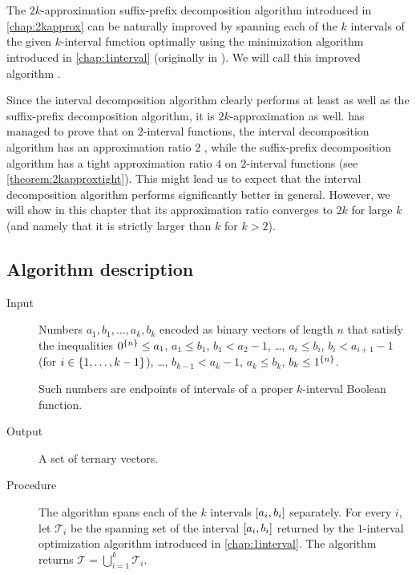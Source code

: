 \chapter{}
\label{chap:betterapprox}

The $2k$-approximation
suffix-prefix decomposition algorithm
introduced in \autoref{chap:2kapprox}
can be naturally improved
by spanning each of the $k$ intervals
of the given $k$-interval function
optimally using the minimization algorithm
introduced in \autoref{chap:1interval}
(originally in \citet{Schieber2005154}).
We will call this improved algorithm
.

Since the interval decomposition algorithm
clearly performs at least as well
as the suffix-prefix decomposition algorithm,
it is $2k$-approximation as well.
\citeauthor{Dubovsky2012} has managed
to prove that on $2$-interval functions,
the interval decomposition algorithm
has an approximation ratio $2$
\citep[p.~39]{Dubovsky2012}, %
while the suffix-prefix decomposition algorithm
has a tight approximation ratio $4$
on $2$-interval functions
(see \autoref{theorem:2kapproxtight}).
This might lead us to expect
that the interval decomposition algorithm
performs significantly better in general.
However,
we will show in this chapter that its approximation ratio
converges to $2k$ for large $k$
(and namely that it is strictly larger than $k$
for $k > 2$).

\section{Algorithm description}

\begin{description}
\item[Input] Numbers $a_1, b_1, \ldots, a_k, b_k$
encoded as binary vectors of length $n$
that satisfy the inequalities
$0^{\{n\}} \leq a_1$,
$a_1 \leq b_1$,
$b_1 < a_2 - 1$,
\ldots,
$a_i \leq b_i$,
$b_i < a_{i+1} - 1$
(for $i \in \{1, \ldots, k-1\}$),
\ldots,
$b_{k-1} < a_k - 1$,
$a_k \leq b_k$,
$b_k \leq 1^{\{n\}}$.

Such numbers are endpoints of intervals
of a proper $k$-interval Boolean function.

\item[Output] A set of ternary vectors.

\item[Procedure]
The algorithm spans each of the $k$ intervals
$[a_i, b_i]$ separately.
For every $i$,
let $\mathcal{T}_i$ be the spanning set of the interval
$[a_i, b_i]$ returned by the $1$-interval
optimization algorithm
introduced in \autoref{chap:1interval}.
The algorithm returns
$\mathcal{T} = \bigcup_{i=1}^k{\mathcal{T}_i}$.
\end{description}

